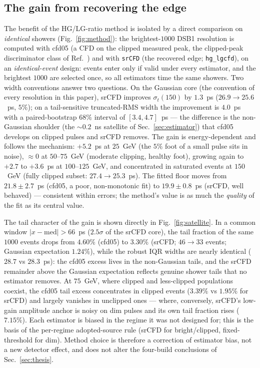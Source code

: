\documentclass[final,5p,times,twocolumn]{elsarticle}
\begin{document}
\subsection{The gain from recovering the edge}
\label{sec:method-gain}
The benefit of the HG/LG-ratio method is isolated by a direct comparison on
\emph{identical} showers (Fig.~\ref{fig:method}): the brightest-$1000$ DSB1 resolution
is computed with cfd05 (a CFD on the clipped measured peak, the clipped-peak
discriminator class of Ref.~\cite{radical})
and with \texttt{srCFD} (the recovered edge; \texttt{hg\_lgcfd}), on an
\emph{identical-event} design: events enter only if valid under every estimator, and
the brightest $1000$ are selected once, so all estimators time the same showers. Two
width conventions answer two questions. On the Gaussian core (the convention of every
resolution in this paper), srCFD improves $\sigma_t(150)$ by $1.3$~ps
($26.9\rightarrow25.6$~ps, $5\%$); on a tail-sensitive truncated-RMS width the
improvement is $4.0$~ps with a paired-bootstrap $68\%$ interval of $[3.4,4.7]$~ps ---
the difference is the non-Gaussian shoulder (the $\sim\!0.2$~ns satellite of
Sec.~\ref{sec:estimator}) that cfd05 develops on clipped pulses and srCFD removes. The
gain is energy-dependent and follows the mechanism: $+5.2$~ps at $25$~GeV (the $5\%$
foot of a small pulse sits in noise), $\approx\!0$ at $50$--$75$~GeV (moderate clipping,
healthy foot), growing again to $+2.7$ to $+3.6$~ps at $100$--$125$~GeV, and
concentrated in saturated events at $150$~GeV (fully clipped subset:
$27.4\rightarrow25.3$~ps). The fitted floor moves from $21.8\pm2.7$~ps (cfd05, a poor,
non-monotonic fit) to $19.9\pm0.8$~ps (srCFD, well behaved) --- consistent within
errors; the method's value is as much the \emph{quality} of the fit as its central
value.

The tail character of the gain is shown directly in Fig.~\ref{fig:satellite}. In a
common window $|x-\mathrm{med}|>66$~ps ($2.5\sigma$ of the srCFD core), the tail
fraction of the same $1000$ events drops from $4.60\%$ (cfd05) to $3.30\%$ (srCFD;
$46\rightarrow33$ events; Gaussian expectation $1.24\%$), while the robust IQR widths
are nearly identical ($28.7$ vs $28.3$~ps): the cfd05 excess lives in the non-Gaussian
tails, and the srCFD remainder above the Gaussian expectation reflects genuine shower
tails that no estimator removes. At $75$~GeV, where clipped and less-clipped
populations coexist, the cfd05 tail excess concentrates in clipped events ($3.39\%$
vs $1.95\%$ for srCFD) and largely vanishes in unclipped ones --- where, conversely,
srCFD's low-gain amplitude anchor is noisy on dim pulses and its own tail fraction
rises ($7.15\%$). Each estimator is biased in the regime it was not designed for;
this is the basis of the per-regime adopted-source rule (srCFD for bright/clipped,
fixed-threshold for dim). Method choice is therefore a correction of estimator bias,
not a new detector effect, and does not alter the four-build conclusions of
Sec.~\ref{sec:thesis}.
\end{document}

